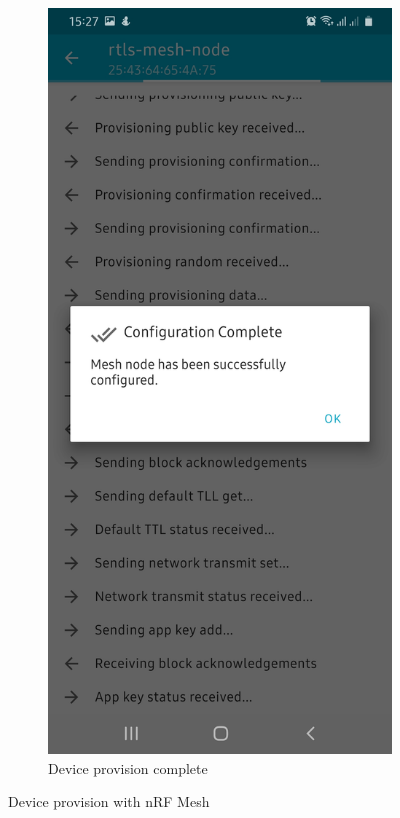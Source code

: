\documentclass[\main/main.tex]{subfiles}
\begin{document}
\begin{figure}[H]
    \begin{subfigure}[b]{0.4\linewidth}
        \centering
        \includegraphics[width=0.9\linewidth]{nRF_Mesh_03.jpg}
        \caption{Device provision complete}
    \end{subfigure}
    \caption{Device provision with nRF Mesh}
    \label{fig:device_provision_with_nrf_mesh_01}
\end{figure}
\end{document}
